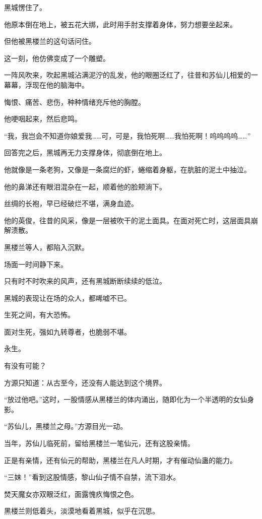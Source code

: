 \begin{this_body}
黑城愣住了。

他原本倒在地上，被五花大绑，此时用手肘支撑着身体，努力想要坐起来。

但他被黑楼兰的这句话问住。

这一刻，他仿佛变成了一个雕塑。

一阵风吹来，吹起黑城沾满泥泞的乱发，他的眼圈泛红了，往昔和苏仙儿相爱的一幕幕，浮现在他的脑海中。

悔恨、痛苦、悲伤，种种情绪充斥他的胸膛。

他哽咽起来，然后悲鸣。

“我，我岂会不知道你娘爱我……可，可是，我怕死啊……我怕死啊！呜呜呜呜……”

回答完之后，黑城再无力支撑身体，彻底倒在地上。

他就像是一条老狗，又像是一条腐烂的虾，蜷缩着身躯，在肮脏的泥土中抽泣。

他的鼻涕还有眼泪混杂在一起，顺着他的脸颊淌下。

丝绸的长袍，早已经破烂不堪，满身血迹。

他的英俊，往昔的风采，像是一层被吹干的泥土面具。在面对死亡时，这层面具崩解溃散。

黑楼兰等人，都陷入沉默。

场面一时间静下来。

只有时不时吹来的风声，还有黑城断断续续的低泣。

黑城的表现让在场的众人，都唏嘘不已。

生死之间，有大恐怖。

面对生死，强如九转尊者，也脆弱不堪。

永生。

有没有可能？

方源只知道：从古至今，还没有人能达到这个境界。

“放过他吧。”这时，一股情感从黑楼兰的体内涌出，随即化为一个半透明的女仙身影。

“苏仙儿，黑楼兰之母。”方源目光一动。

当年，苏仙儿临死前，留给黑楼兰一笔仙元，还有这股亲情。

正是有亲情，还有仙元的帮助，黑楼兰在凡人时期，才有催动仙蛊的能力。

“三妹！”看到这股情感，黎山仙子情不自禁，流下泪水。

焚天魔女亦双眼泛红，面露愧疚悔恨之色。

黑楼兰则低着头，淡漠地看着黑城，似乎在沉思。


\end{this_body}
